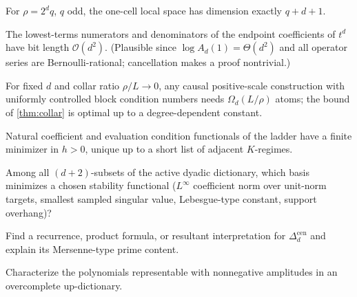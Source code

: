 \documentclass[11pt,oneside]{article}
\numberwithin{equation}{section}
\theoremstyle{definition}
\theoremstyle{remark}
\newcommand{\bigO}{\mathcal O}
\begin{document}
\begin{conjecture}
\label{conj:odd-dim}
For $\rho=2^{d}q$, $q$ odd, the one-cell local space has dimension
exactly $q+d+1$.
\end{conjecture}

\begin{conjecture}
\label{conj:bit-growth}
The lowest-terms numerators and denominators of the endpoint
coefficients of $t^{d}$ have bit length $\bigO(d^{2})$.  (Plausible
since $\log A_d(1)=\Theta(d^{2})$ and all operator series are
Bernoulli-rational; cancellation makes a proof nontrivial.)
\end{conjecture}

\begin{conjecture}
\label{conj:pareto}
For fixed $d$ and collar ratio $\rho/L\to0$, any causal
positive-scale construction with uniformly controlled block condition
numbers needs $\Omega_d(L/\rho)$ atoms; the bound of
\cref{thm:collar} is optimal up to a degree-dependent constant.
\end{conjecture}

\begin{conjecture}
\label{conj:conditioning-scale}
Natural coefficient and evaluation condition functionals of the
ladder have a finite minimizer in $h>0$, unique up to a short list of
adjacent $K$-regimes.
\end{conjecture}

\begin{question}
\label{q:condition-basis}
Among all $(d+2)$-subsets of the active dyadic dictionary, which
basis minimizes a chosen stability functional ($L^\infty$ coefficient
norm over unit-norm targets, smallest sampled singular value,
Lebesgue-type constant, support overhang)?
\end{question}

\begin{question}
\label{q:central-det}
Find a recurrence, product formula, or resultant interpretation for
$\Delta^{\mathrm{cen}}_d$ and explain its Mersenne-type prime
content.
\end{question}

\begin{question}
\label{q:positive}
Characterize the polynomials representable with nonnegative
amplitudes in an overcomplete up-dictionary.
\end{question}
\end{document}
